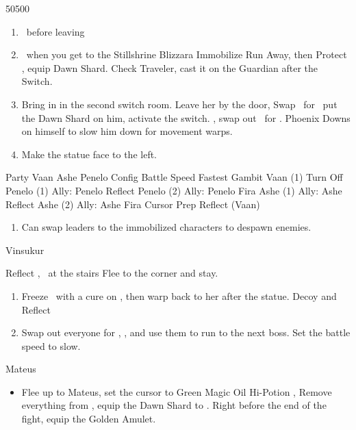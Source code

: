 \begin{shop}{50500}
\end{shop}
\begin{enumerate}
\item \save\ before leaving
\item \save\ when you get to the Stillshrine
\ashef Blizzara \penelo
\penelof Immobilize \penelo
\vaanf Run Away, then Protect \vaan, equip Dawn Shard. Check Traveler, cast it on the Guardian after the Switch.
\item Bring in \penelo in the second switch room. Leave her by the door, Swap \vaan\ for \balthier\, put the Dawn Shard on him, activate the switch. \leader{\penelo}, swap out \penelo\ for \vaan.
\balthierf Phoenix Downs on himself to slow him down for movement warps.
\item Make the statue face to the left.
\end{enumerate}

\begin{gambit}
Party	Vaan	Ashe	Penelo		
Config	Battle Speed	Fastest			
Gambit	Vaan (1)	Turn Off			
	Penelo (1)	Ally: Penelo			Reflect
	Penelo (2)	Ally: Penelo			Fira
	Ashe (1)	Ally: Ashe			Reflect
	Ashe (2)	Ally: Ashe			Fira
Cursor	Prep Reflect (Vaan)				
\end{gambit}
\begin{enumerate}
\item Can swap leaders to the immobilized characters to despawn enemies.
\end{enumerate}
\begin{battle}{Vinsukur}
\begin{itemize}
\vaanf Reflect \ashe, \penelo\ at the stairs
\vaan Flee to the corner and stay.
\end{itemize}
\end{battle}
\begin{enumerate}
\item Freeze \penelo\ with a cure on \vaan, then warp back to her after the statue.
\vaan Decoy and Reflect \vaan
\item Swap out everyone for \balthier, \basch, and use them to run to the next boss. Set the battle speed to slow.
\end{enumerate}
\begin{battle}{Mateus}
\begin{itemize}
\item Flee up to Mateus, set the cursor to Green Magic
\penelof Oil \penelo
\vaanf Hi-Potion \vaan, Remove everything from \basch, equip the Dawn Shard to \vaan. Right before the end of the fight, equip the Golden Amulet.
\end{itemize}
\end{battle}